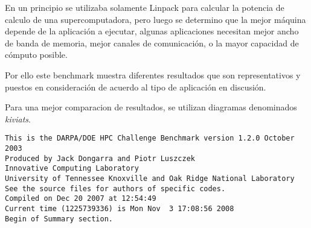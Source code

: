 \documentclass[a4paper]{report}
\begin{document}
En un principio se utilizaba solamente Linpack para calcular la potencia
de calculo de una supercomputadora, pero luego se determino que la mejor
m\'aquina depende de la aplicaci\'on a ejecutar, algunas aplicaciones
necesitan mejor ancho de banda de memoria, mejor canales de comunicaci\'on, o
la mayor capacidad de c\'omputo posible.

\bigskip

Por ello este benchmark muestra diferentes resultados que son representativos
y puestos en consideraci\'on de acuerdo al tipo de aplicaci\'on en discusi\'on.


Para una mejor comparacion de resultados, se utilizan diagramas denominados
{\it kiviats}.

\begin{verbatim}
This is the DARPA/DOE HPC Challenge Benchmark version 1.2.0 October 2003
Produced by Jack Dongarra and Piotr Luszczek
Innovative Computing Laboratory
University of Tennessee Knoxville and Oak Ridge National Laboratory
See the source files for authors of specific codes.
Compiled on Dec 20 2007 at 12:54:49
Current time (1225739336) is Mon Nov  3 17:08:56 2008
Begin of Summary section.
\end{verbatim}
\end{document}

